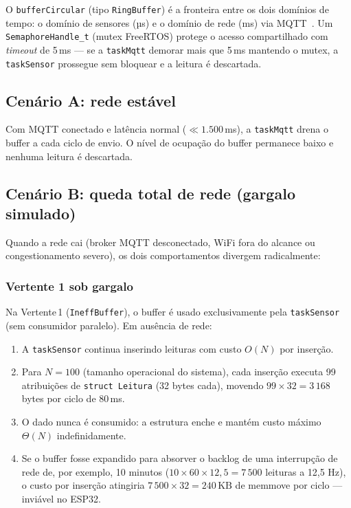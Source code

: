 \documentclass[12pt, a4paper]{article}
\theoremstyle{definition}
\theoremstyle{remark}
\begin{document}
O \texttt{bufferCircular} (tipo \texttt{RingBuffer}) é a fronteira entre os
dois domínios de tempo: o domínio de sensores (µs) e o domínio de rede (ms)
via MQTT~\cite{mqtt,pubsubclient}.
Um \texttt{SemaphoreHandle\_t} (mutex FreeRTOS) protege o acesso
compartilhado com \emph{timeout} de 5\,ms — se a \texttt{taskMqtt}
demorar mais que 5\,ms mantendo o mutex, a \texttt{taskSensor} prossegue
sem bloquear e a leitura é descartada.

\subsection{Cenário A: rede estável}

Com MQTT conectado e latência normal ($\ll 1.500$\,ms), a
\texttt{taskMqtt} drena o buffer a cada ciclo de envio. O nível de ocupação
do buffer permanece baixo e nenhuma leitura é descartada.

\subsection{Cenário B: queda total de rede (gargalo simulado)}

Quando a rede cai (broker MQTT desconectado, WiFi fora do alcance ou
congestionamento severo), os dois comportamentos divergem radicalmente:

\subsubsection{Vertente 1 sob gargalo}

Na Vertente\,1 (\texttt{IneffBuffer}), o buffer é usado exclusivamente pela
\texttt{taskSensor} (sem consumidor paralelo). Em ausência de rede:

\begin{enumerate}
  \item A \texttt{taskSensor} continua inserindo leituras com custo $O(N)$
    por inserção.
  \item Para $N = 100$ (tamanho operacional do sistema), cada inserção
    executa 99 atribuições de \texttt{struct Leitura} (32 bytes cada),
    movendo $99 \times 32 = 3\,168$ bytes por ciclo de 80\,ms.
  \item O dado nunca é consumido: a estrutura enche e mantém custo máximo
    $\Theta(N)$ indefinidamente.
  \item Se o buffer fosse expandido para absorver o backlog de uma
    interrupção de rede de, por exemplo, 10 minutos
    ($10 \times 60 \times 12{,}5 = 7\,500$ leituras a 12,5 Hz),
    o custo por inserção atingiria $7\,500 \times 32 = 240\,\text{KB}$
    de memmove por ciclo — inviável no ESP32.
\end{enumerate}
\end{document}
